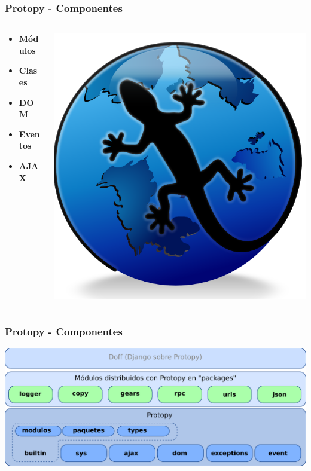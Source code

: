 \documentclass{beamer}
\begin{document}
\begin{frame}
    \frametitle{Protopy - Componentes}
        \begin{columns}[c]
         \begin{column}{5cm}
    
            \begin{itemize}
                \item {\bf Módulos}
                \item {\bf Clases}
                \item {\bf DOM}
                \item {\bf Eventos}
                \item {\bf AJAX}
             \end{itemize}
         \end{column}
         \begin{column}{5cm}
            \includegraphics[scale=0.5]{protopy.png}
         \end{column}
     \end{columns}                       
\end{frame}

\begin{frame}
    \frametitle{Protopy - Componentes}
    \includegraphics[scale=0.47]{esquema_protopy.pdf}
\end{frame}
\end{document}
